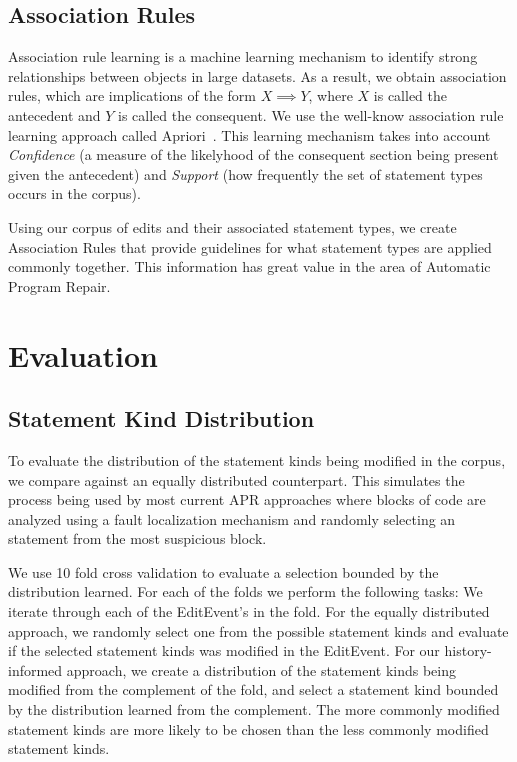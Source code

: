 \documentclass[sigconf]{acmart}
\begin{document}
\subsection{Association Rules}
\label{assocRules}
Association rule learning is a machine learning mechanism to identify
strong relationships between objects in large datasets. 
As a result, we obtain association rules, which are implications of the
form $X \implies Y$, where $X$ is called the antecedent and 
$Y$ is called the consequent.
We use the well-know association rule learning approach called 
Apriori~\cite{Agrawal94}. This learning mechanism takes into 
account \textit{Confidence} (a measure of the likelyhood 
of the consequent section being present given the 
antecedent) and \textit{Support} (how frequently the set of
statement types occurs in the corpus).

Using our corpus of edits and their associated statement types, 
we create Association Rules that provide guidelines
for what statement types are applied commonly together. This
information has great value in the area of Automatic 
Program Repair.

\section{Evaluation}
\label{eval}

\subsection{Statement Kind Distribution}
To evaluate the distribution of the statement kinds being modified
in the corpus, we compare against an equally distributed counterpart.
This simulates the process being used by most current APR approaches
where blocks of code are analyzed using a fault localization 
mechanism and randomly selecting an statement from the most
suspicious block.

We use 10 fold
cross validation to evaluate a selection bounded by the distribution
learned. For each of the folds we perform the following
tasks:
We iterate through each of the EditEvent's in the fold. For
the equally distributed approach, we randomly select one from 
the possible statement kinds and evaluate if the selected
statement kinds was modified in the EditEvent.
For our history-informed approach, we create a distribution
of the statement kinds being modified from the complement of the fold, 
and select a statement
kind bounded by the distribution 
learned from the complement. The more commonly modified statement
kinds are more likely to be chosen than the less commonly modified
statement kinds.
\end{document}

